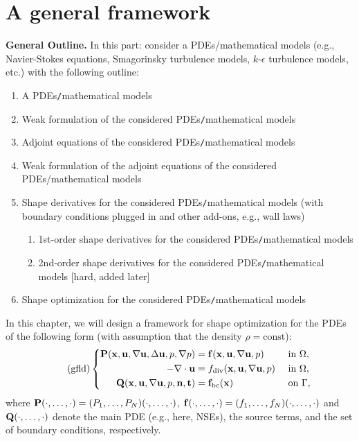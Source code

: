 \documentclass[oneside,11pt]{book}
\numberwithin{equation}{section}
\begin{document}
\section{A general framework}
\textbf{General Outline.} In this part: consider a PDEs/mathematical models (e.g., Navier-Stokes equations, Smagorinsky turbulence models, $k$-$\epsilon$ turbulence models, etc.) with the following outline:
\begin{enumerate}
    \item A PDEs\texttt{/}mathematical models
    \item Weak formulation of the considered PDEs\texttt{/}mathematical models
    \item Adjoint equations of the considered PDEs\texttt{/}mathematical models
    \item Weak formulation of the adjoint equations of the considered PDEs/mathematical models
    \item Shape derivatives for the considered PDEs\texttt{/}mathematical models (with boundary conditions plugged in and other add-ons, e.g., wall laws)
    \begin{enumerate}
        \item 1st-order shape derivatives for the considered PDEs\texttt{/}mathematical models
        \item 2nd-order shape derivatives for the considered PDEs\texttt{/}mathematical models [hard, added later]
    \end{enumerate}
    \item Shape optimization for the considered PDEs\texttt{/}mathematical models
\end{enumerate}

In this chapter, we will design a framework for shape optimization for the PDEs of the following form (with assumption that the density $\rho = \mbox{const}$):
\begin{equation}
    \label{general stationary fluid dynamics PDEs}
    \tag{gfld}
    \left\{\begin{split}
        {\bf P}({\bf x},{\bf u},\nabla{\bf u},\Delta{\bf u},p,\nabla p) &= {\bf f}({\bf x},{\bf u},\nabla{\bf u},p) &&\mbox{ in } \Omega,\\
        -\nabla\cdot{\bf u} &= f_{\rm div}({\bf x},{\bf u},\nabla{\bf u},p) &&\mbox{ in } \Omega,\\
        {\bf Q}({\bf x},{\bf u},\nabla{\bf u},p,{\bf n},{\bf t}) &= {\bf f}_{\rm bc}({\bf x}) &&\mbox{ on } \Gamma,
    \end{split}\right.
\end{equation}
where ${\bf P}(\cdot,\ldots,\cdot) = (P_1,\ldots,P_N)(\cdot,\ldots,\cdot)$, ${\bf f}(\cdot,\ldots,\cdot) = (f_1,\ldots,f_N)(\cdot,\ldots,\cdot)$ and ${\bf Q}(\cdot,\ldots,\cdot)$ denote the main PDE (e.g., here, NSEs), the source terms, and the set of boundary conditions, respectively.
\end{document}
